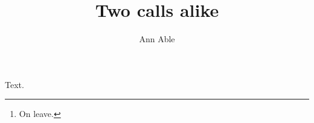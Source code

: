 \documentclass{amsart}
\begin{document}
\title{Two calls alike}
\author{Ann Able}
\address{Univ A, City A}
\address{Univ A, City A\footnote{On leave.}}
\maketitle
Text.
\end{document}
